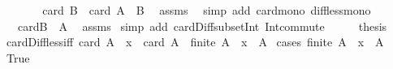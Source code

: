 \begin{isabellebody}
\ \ \isamarkupfalse%
\ \isamarkupfalse%
\ {\isachardoublequoteopen}{\isasymdots}\ {\isacharless}{\kern0pt}\ card\ B\ {\isacharminus}{\kern0pt}\ card\ {\isacharparenleft}{\kern0pt}A\ {\isasyminter}\ B{\isacharparenright}{\kern0pt}{\isachardoublequoteclose}\ \isamarkupfalse%
\ assms{\isacharparenleft}{\kern0pt}{}{\isacharcomma}{\kern0pt}{}{\isacharparenright}{\kern0pt}\ \isamarkupfalse%
\ {\isacharparenleft}{\kern0pt}simp\ add{\isacharcolon}{\kern0pt}\ card{\isacharunderscore}{\kern0pt}mono\ diff{\isacharunderscore}{\kern0pt}less{\isacharunderscore}{\kern0pt}mono{\isacharparenright}{\kern0pt}\isanewline
\ \ \isamarkupfalse%
\ \isamarkupfalse%
\ {\isachardoublequoteopen}{\isasymdots}\ {\isacharequal}{\kern0pt}\ card{\isacharparenleft}{\kern0pt}B\ {\isacharminus}{\kern0pt}\ A{\isacharparenright}{\kern0pt}{\isachardoublequoteclose}\ \isamarkupfalse%
\ assms{\isacharparenleft}{\kern0pt}{}{\isacharcomma}{\kern0pt}{}{\isacharparenright}{\kern0pt}\ \isamarkupfalse%
{\isacharparenleft}{\kern0pt}simp\ add{\isacharcolon}{\kern0pt}\ card{\isacharunderscore}{\kern0pt}Diff{\isacharunderscore}{\kern0pt}subset{\isacharunderscore}{\kern0pt}Int\ Int{\isacharunderscore}{\kern0pt}commute{\isacharparenright}{\kern0pt}\isanewline
\ \ \isamarkupfalse%
\ \isamarkupfalse%
\ {\isacharquery}{\kern0pt}thesis\ \isacommand{{\isachardot}{\kern0pt}}\isamarkupfalse%
\isanewline
{}\isamarkupfalse%
%
\endisatagproof
{\isafoldproof}%
%
\isadelimproof
\isanewline
%
\endisadelimproof
\isanewline
{}\isamarkupfalse%
\ card{\isacharunderscore}{\kern0pt}Diff{}{\isacharunderscore}{\kern0pt}less{\isacharunderscore}{\kern0pt}iff{\isacharcolon}{\kern0pt}\ {\isachardoublequoteopen}card\ {\isacharparenleft}{\kern0pt}A\ {\isacharminus}{\kern0pt}\ {\isacharbraceleft}{\kern0pt}x{\isacharbraceright}{\kern0pt}{\isacharparenright}{\kern0pt}\ {\isacharless}{\kern0pt}\ card\ A\ {\isasymlongleftrightarrow}\ finite\ A\ {\isasymand}\ x\ {\isasymin}\ A{\isachardoublequoteclose}\isanewline
%
\isadelimproof
%
\endisadelimproof
%
\isatagproof
{}\isamarkupfalse%
\ {\isacharparenleft}{\kern0pt}cases\ {\isachardoublequoteopen}finite\ A\ {\isasymand}\ x\ {\isasymin}\ A{\isachardoublequoteclose}{\isacharparenright}{\kern0pt}\isanewline
\ \ \isamarkupfalse%
\ True\isanewline
\ \ \isamarkupfalse%
\ \isamarkupfalse%

\end{isabellebody}
